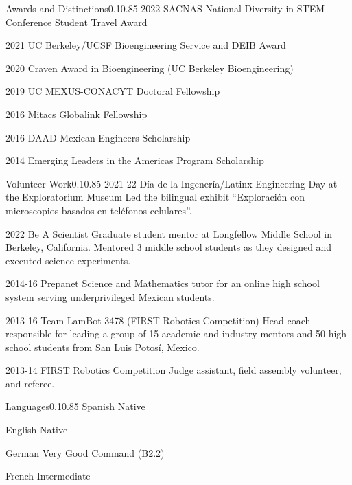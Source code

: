 \documentclass{federico_cv}
\begin{document}
\begin{tblSection}{Awards and Distinctions}{0.1}{0.85}
\award
{2022}
{SACNAS National Diversity in STEM Conference Student Travel Award}

\award
{2021}
{UC Berkeley/UCSF Bioengineering Service and DEIB Award}

\award
{2020}
{Craven Award in Bioengineering (UC Berkeley Bioengineering)}

\award
{2019}
{UC MEXUS-CONACYT Doctoral Fellowship}

\award
{2016}
{Mitacs Globalink Fellowship}

\award
{2016}
{DAAD Mexican Engineers Scholarship}

\award
{2014}
{Emerging Leaders in the Americas Program Scholarship}

\end{tblSection}


\begin{tblSection}{Volunteer Work}{0.1}{0.85}
\job
{2021-22}
{Día de la Ingenería/Latinx Engineering Day at the Exploratorium Museum}
{Led the bilingual exhibit ``Exploración con microscopios basados en teléfonos celulares''.}

\leftbfrightsinglenobreak
{2022}
{Be A Scientist}
{Graduate student mentor at Longfellow Middle School in Berkeley, California. Mentored 3 middle school students as they designed and executed science experiments.}

\job
{2014-16}
{Prepanet}
{Science and Mathematics tutor for an online high school system serving underprivileged Mexican students.}

\job
{2013-16}
{Team LamBot 3478 (FIRST Robotics Competition)}
{Head coach responsible for leading a group of 15 academic and industry mentors and 50 high school students from San Luis Potosí, Mexico.}

\job
{2013-14}
{FIRST Robotics Competition}
{Judge assistant, field assembly volunteer, and referee.}

\end{tblSection}


\begin{tblSection}{Languages}{0.1}{0.85}
\leftrightsingletight
{Spanish}
{Native}

\leftrightsingletight
{English}
{Native}

\leftrightsingletight
{German}
{Very Good Command (B2.2)}

\leftrightsingletight
{French}
{Intermediate}

\end{tblSection}
\end{document}
